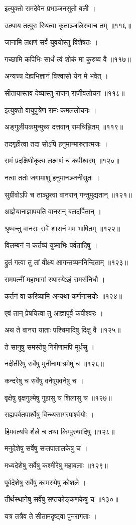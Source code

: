इत्युक्तो रामदेवेन प्रभञ्जनसुतो बली ।

उत्थाय तत्पुरः स्थित्वा कृताञ्जलिरुवाच तम् ॥११६॥

जानामि लक्षणं सर्वं युवयोस्तु विशेषतः ।

गच्छामि कपिभिः सार्धं त्वं शोकं मा कुरुष्व वै ॥११७॥

अन्यच्च देह्यभिज्ञानं विश्वासो येन मे भवेत् ।

सीतायास्तव देव्यास्तु राजन् राजीवलोचन ॥११८॥

इत्युक्तो वायुपुत्रेण रामः कमललोचनः ।

अङ्गुलीयकमुन्मुच्य दत्तवान् रामचिह्नितम् ॥११९॥

तदगृहीत्वा तदा सोऽपि हनुमान्मारुतात्मजः ।

रामं प्रदक्षिणीकृत्य लक्ष्मणं च कपीश्वरम् ॥१२०॥

नत्वा ततो जगामाशु हनुमानञ्जनीसुतः ।

सुग्रीवोऽपि च ताञ्छुत्वा वानरान् गन्तुमुद्यतान् ॥१२१॥

आज्ञेयानाज्ञापयति वानरान् बलदर्पितान् ।

श्रृण्वन्तु वानराः सर्वे शासनं मम भाषितम् ॥१२२॥

विलम्बनं न कर्तव्यं युष्माभिः पर्वतादिषु ।

द्रुतं गत्वा तु तां वीक्ष्य आगन्तव्यमनिन्दिताम् ॥१२३॥

रामपत्नीं महाभागां स्थास्येऽहं रामसंनिधौ ।

कर्तनं वा करिष्यामि अन्यथा कर्णनासयोः ॥१२४॥

एवं तान् प्रेषयित्वा तु आज्ञापूर्वं कपीश्वरः ।

अथ ते वानरा याताः पश्चिमादिषु दिक्षु वै ॥१२५॥

ते सानुषु समस्तेषु गिरीणामपि मूर्धसु ।

नदीतीरेषु सर्वेषु मुनीनामाश्रमेषु च ॥१२६॥

कन्दरेषु च सर्वेषु वनेषूपवनेषु च ।

वृक्षेषु वृक्षगुल्मेषु गुहासु च शिलासु च ॥१२७॥

सह्यपर्वतपार्श्वेषु विन्ध्यसागरपार्श्वयोः ।

हिमवत्यपि शैले च तथा किम्पुरुषादिषु ॥१२८॥

मनुदेशेषु सर्वेषु सप्तपातालकेषु च ।

मध्यदेशेषु सर्वेषु कश्मीरेषु महाबलाः ॥१२९॥

पूर्वदेशेषु सर्वेषु कामरुपेषु कोशले ।

तीर्थस्थानेषु सर्वेषु सप्तकोङ्कणकेषु च ॥१३०॥

यत्र तत्रैव ते सीतामदृष्ट्वा पुनरागताः ।

